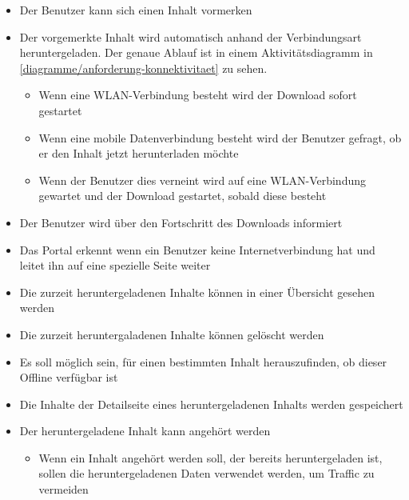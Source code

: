 \begin{itemize}
	\item Der Benutzer kann sich einen Inhalt vormerken
	\item Der vorgemerkte Inhalt wird automatisch anhand der Verbindungsart heruntergeladen. Der genaue Ablauf ist in einem Aktivitätsdiagramm in \autoref{diagramme/anforderung-konnektivitaet} zu sehen.
	
	\begin{itemize}
		\item Wenn eine WLAN-Verbindung besteht wird der Download sofort gestartet
		\item Wenn eine mobile Datenverbindung besteht wird der Benutzer gefragt, ob er den Inhalt jetzt herunterladen möchte
		\item Wenn der Benutzer dies verneint wird auf eine WLAN-Verbindung gewartet und der Download gestartet, sobald diese besteht
	\end{itemize}
	

	\item Der Benutzer wird über den Fortschritt des Downloads informiert
	\item Das Portal erkennt wenn ein Benutzer keine Internetverbindung hat und leitet ihn auf eine spezielle Seite weiter
	\item Die zurzeit heruntergeladenen Inhalte können in einer Übersicht gesehen werden
 	\item Die zurzeit heruntergaladenen Inhalte können gelöscht werden
	\item Es soll möglich sein, für einen bestimmten Inhalt herauszufinden, ob dieser Offline verfügbar ist
	\item Die Inhalte der Detailseite eines heruntergeladenen Inhalts werden gespeichert
	\item Der heruntergeladene Inhalt kann angehört werden
	\begin{itemize}
		\item Wenn ein Inhalt angehört werden soll, der bereits heruntergeladen ist, sollen die heruntergeladenen Daten verwendet werden, um Traffic zu vermeiden
	\end{itemize}
	
\end{itemize}
